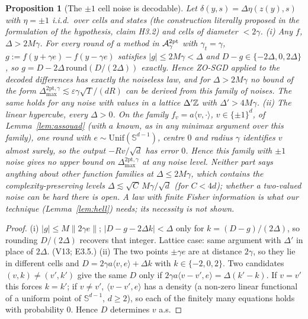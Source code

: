 \documentclass[11pt,a4paper]{article}
\numberwithin{equation}{section}
\newtheorem{proposition}[theorem]{Proposition}
\theoremstyle{definition}
\theoremstyle{remark}
\newcommand{\norm}[1]{\lVert #1\rVert}\newcommand{\abs}[1]{\lvert #1\rvert}\newcommand{\ip}[2]{\langle #1,#2\rangle}
\newcommand{\Dmax}{\Delta_{\max}}\newcommand{\Dcp}{\Delta_{\rm cp}}\newcommand{\Dlow}{\Delta_{\rm low}}
\newcommand{\Unif}{\mathrm{Unif}}\newcommand{\TV}{\mathrm{TV}}\newcommand{\BC}{\mathrm{BC}}\newcommand{\tmix}{t_{\rm mix}}
\newcommand{\Sph}{\mathbb S^{d-1}}\newcommand{\Ball}{\mathbb B}\newcommand{\iid}{\mathrm{iid}}
\begin{document}
\begin{proposition}[The $\pm1$ cell noise is decodable]\label{prop:pm1}
Let $\delta(y,s)=\Delta\eta(z(y),s)$ with $\eta=\pm1$ i.i.d.\ over cells and states (the construction literally proposed in the formulation of the hypothesis, claim H3.2) and cells of diameter $<2\gamma$.
(i) \emph{Any $f$, $\Delta>2M\gamma$.} For every round of a method in $\mathcal A^{\rm 2pt}_\gamma$ with $\gamma_t=\gamma$, $g:=f(y+\gamma e)-f(y-\gamma e)$ satisfies $\abs g\le2M\gamma<\Delta$ and $D-g\in\{-2\Delta,0,2\Delta\}$, so $g=D-2\Delta\,\mathrm{round}(D/(2\Delta))$ exactly. Hence ZO-SGD applied to the decoded differences has exactly the noiseless law, and for $\Delta>2M\gamma$ no bound of the form $\Dmax^{\mathrm{2pt},\gamma}\lesssim\varepsilon\gamma\sqrt T/(dR)$ can be derived from this family of noises. The same holds for any noise with values in a lattice $\Delta'\mathbb Z$ with $\Delta'>4M\gamma$.
(ii) \emph{The linear hypercube, every $\Delta>0$.} On the family $f_v=a\ip v\cdot$, $v\in\{\pm1\}^d$, of Lemma~\ref{lem:assouad} (with $a$ known, as in any minimax argument over this family), one round with $e\sim\Unif(\Sph)$, centre $0$ and radius $\gamma$ identifies $v$ almost surely, so the output $-Rv/\sqrt d$ has error $0$. Hence this family with $\pm1$ noise gives no upper bound on $\Dmax^{\mathrm{2pt},\gamma}$ at any noise level.
Neither part says anything about other function families at $\Delta\le2M\gamma$, which contains the complexity-preserving levels $\Delta\lesssim\sqrt C\,M\gamma/\sqrt d$ (for $C<4d$); whether a two-valued noise can be hard there is open. A law with finite Fisher information is what \emph{our} technique (Lemma~\ref{lem:hell}) needs; its necessity is not shown.
\end{proposition}
\begin{proof}
(i) $\abs g\le M\norm{2\gamma e}$; $\abs{D-g-2\Delta k}<\Delta$ only for $k=(D-g)/(2\Delta)$, so rounding $D/(2\Delta)$ recovers that integer. Lattice case: same argument with $\Delta'$ in place of $2\Delta$. (V13; E3.5.)
(ii) The two points $\pm\gamma e$ are at distance $2\gamma$, so they lie in different cells and $D=2\gamma a\ip ve+\Delta k$ with $k\in\{-2,0,2\}$. Two candidates $(v,k)\ne(v',k')$ give the same $D$ only if $2\gamma a\ip{v-v'}e=\Delta(k'-k)$. If $v=v'$ this forces $k=k'$; if $v\ne v'$, $\ip{v-v'}e$ has a density (a non-zero linear functional of a uniform point of $\Sph$, $d\ge2$), so each of the finitely many equations holds with probability $0$. Hence $D$ determines $v$ a.s.
\end{proof}
\end{document}
